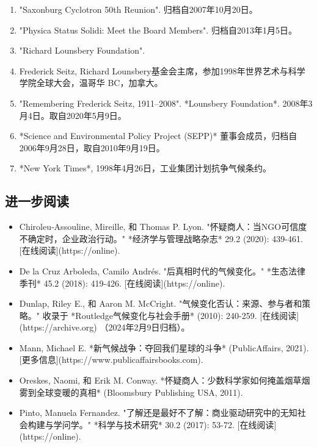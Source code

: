 \begin{enumerate}
\item "Saxonburg Cyclotron 50th Reunion". 归档自2007年10月20日。
\item "Physica Status Solidi: Meet the Board Members". 归档自2013年1月5日。
\item "Richard Lounsbery Foundation".
\item Frederick Seitz, Richard Lounsbery基金会主席，参加1998年世界艺术与科学学院全球大会，温哥华 BC，加拿大。
\item "Remembering Frederick Seitz, 1911–2008". *Lounsbery Foundation*. 2008年3月4日。取自2020年5月9日。
\item *Science and Environmental Policy Project (SEPP)* 董事会成员，归档自2006年9月28日，取自2010年9月19日。
\item *New York Times*, 1998年4月26日，工业集团计划抗争气候条约。
\end{enumerate}
\subsection{进一步阅读}
\begin{itemize}
\item Chiroleu‐Assouline, Mireille, 和 Thomas P. Lyon. "怀疑商人：当NGO可信度不确定时，企业政治行动。" *经济学与管理战略杂志* 29.2 (2020): 439-461. [在线阅读](https://online).
\item De la Cruz Arboleda, Camilo Andrés. "后真相时代的气候变化。" *生态法律季刊* 45.2 (2018): 419-426. [在线阅读](https://online).
\item Dunlap, Riley E., 和 Aaron M. McCright. "气候变化否认：来源、参与者和策略。" 收录于 *Routledge气候变化与社会手册* (2010): 240-259. [在线阅读](https://archive.org) （2024年2月9日归档）。
\item Mann, Michael E. *新气候战争：夺回我们星球的斗争* (PublicAffairs, 2021). [更多信息](https://www.publicaffairsbooks.com).
\item Oreskes, Naomi, 和 Erik M. Conway. *怀疑商人：少数科学家如何掩盖烟草烟雾到全球变暖的真相* (Bloomsbury Publishing USA, 2011).
\item Pinto, Manuela Fernandez. "了解还是最好不了解：商业驱动研究中的无知社会构建与学问学。" *科学与技术研究* 30.2 (2017): 53-72. [在线阅读](https://online).
\end{itemize}
